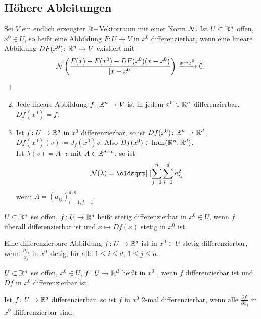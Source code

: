 \subsection{H\"ohere Ableitungen}
\begin{definition}
	Sei $ V $ ein endlich erzeugter $ \mathbb{R}- $Vektorraum mit einer Norm $ \mathcal N $. Ist $ U\subset\mathbb{R}^n $ offen, $ x^0\in U $, so hei\ss t eine Abbildung $ F\colon U\rightarrow V $ in $ x^0 $ differenzierbar, wenn eine lineare Abbildung $ DF(x^0)\colon \mathbb{R}^n\rightarrow V $ existiert mit
	\[ \mathcal N\left(\frac{F(x)-F(x^0)-DF(x^0)(x-x^0)}{|x-x^0|}\right)\xrightarrow{x\to x^0}0. \]
\end{definition}
\begin{beispiel*}
	\begin{enumerate}
		\item[]
		\item Jede lineare Abbildung $ f\colon\mathbb{R}^n\rightarrow V $ ist in jedem $ x^0\in\mathbb{R}^n $ differenzierbar, $ Df(x^0)=f $.
		\item Ist $ f\colon U\rightarrow\mathbb{R}^d $ in $ x^0 $ differenzierbar, so ist $ Df(x^0)\colon\mathbb{R}^n\rightarrow\mathbb{R}^d $, $ Df(x^0)(v)\coloneqq J_f(x^0)v $. Also $ Df(x^0)\in\hom(\mathbb{R}^n,\mathbb{R}^d) $.\\
		Ist $ \lambda(v)=A\cdot v $ mit $ A\in\mathbb{R}^{d\times n} $, so ist \[ \sN(\lambda)=\sqrt{\sum_{j=1}^n\sum_{i=1}^d a_{ij}^2} \]
		wenn $ A=(a_{ij})_{i=1,j=1}^{d,n} $.
	\end{enumerate}
\end{beispiel*}
\begin{definition}
	$ U\subset\mathbb{R}^n $ sei offen, $ f\colon U\rightarrow\mathbb{R}^d $ hei\ss t stetig differenzierbar in $ x^0\in U $, wenn $ f $ \"uberall differenzierbar ist und $ x\mapsto Df(x) $ stetig in $ x^0 $ ist.
\end{definition}
\begin{bemerkung*}
	Eine differenzierbare Abbildung $ f\colon U\rightarrow\mathbb{R}^d $ ist in $ x^0\in U $ stetig differenzierbar, wenn $ \frac{\partial f_i}{x_j} $ in $ x^0 $ stetig, f\"ur alle $ 1\leq i\leq d $, $ 1\leq j\leq n $.
\end{bemerkung*}
\begin{definition}
	$ U\subset\mathbb{R}^n $ sei offen, $ x^0\in U $, $ f\colon U\rightarrow\mathbb{R}^d $ hei\ss t in $ x^0 $ , wenn $ f $ differenzierbar ist und $ Df $ in $ x^0 $ differenzierbar ist.
\end{definition}
\begin{bemerkung*}
	Ist $ f\colon U\rightarrow\mathbb{R}^d $ differenzierbar, so ist $ f $ in $ x^0 $ 2-mal differenzierbar, wenn alle $ \frac{\partial f_i}{\partial x_j} $ in $ x^0 $ differenzierbar sind.
\end{bemerkung*}

